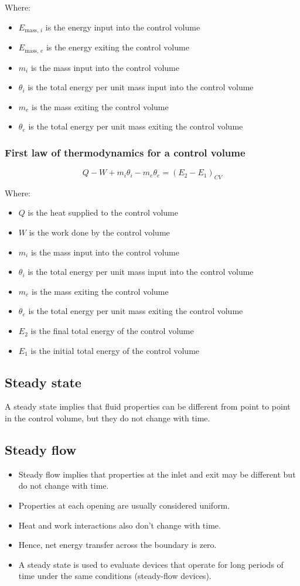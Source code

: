 \documentclass[11pt]{article}
\begin{document}
Where:
\begin{itemize}
\item \(E_{\text{mass, } i}\) is the energy input into the control volume
\item \(E_{\text{mass, } e}\) is the energy exiting the control volume
\item \(m_i\) is the mass input into the control volume
\item \(\theta_i\) is the total energy per unit mass input into the control volume
\item \(m_e\) is the mass exiting the control volume
\item \(\theta_e\) is the total energy per unit mass exiting the control volume
\end{itemize}
\subsubsection{First law of thermodynamics for a control volume}
\label{sec:org86ae8ce}
\[Q - W + m_i \theta_i - m_e \theta_e = \left(E_2 - E_1 \right)_{CV}\]

Where:
\begin{itemize}
\item \(Q\) is the heat supplied to the control volume
\item \(W\) is the work done by the control volume
\item \(m_i\) is the mass input into the control volume
\item \(\theta_i\) is the total energy per unit mass input into the control volume
\item \(m_e\) is the mass exiting the control volume
\item \(\theta_e\) is the total energy per unit mass exiting the control volume
\item \(E_2\) is the final total energy of the control volume
\item \(E_1\) is the initial total energy of the control volume
\end{itemize}
\subsection{Steady state}
\label{sec:org0b5f89e}
A steady state implies that fluid properties can be different from point to point in the control volume, but they do not change with time.
\subsection{Steady flow}
\label{sec:org9aeced0}
\begin{itemize}
\item Steady flow implies that properties at the inlet and exit may be different but do not change with time.
\item Properties at each opening are usually considered uniform.
\item Heat and work interactions also don't change with time.
\item Hence, net energy transfer across the boundary is zero.
\item A steady state is used to evaluate devices that operate for long periods of time under the same conditions (steady-flow devices).
\end{itemize}
\end{document}
